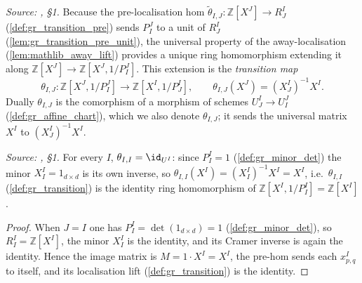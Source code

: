 \begin{definition}\leanok
  \label{def:gr_transition}
  \textit{Source: \cite{nitsure-hilbert-quot}, \S 1.}
  Because the pre-localisation hom \(\tilde\theta_{I,J} : \mathbb{Z}[X^J] \to
  R^I_J\) (\cref{def:gr_transition_pre}) sends \(P^J_I\) to a unit of \(R^I_J\)
  (\cref{lem:gr_transition_pre_unit}), the universal property of the
  away-localisation (\cref{lem:mathlib_away_lift}) provides a unique ring
  homomorphism extending it along \(\mathbb{Z}[X^J] \to \mathbb{Z}[X^J, 1/P^J_I]\).
  This extension is the \emph{transition map}
  \[
    \theta_{I,J} : \mathbb{Z}[X^J, 1/P^J_I] \longrightarrow
    \mathbb{Z}[X^I, 1/P^I_J], \qquad \theta_{I,J}(X^J) = (X^I_J)^{-1} X^I .
  \]
  Dually \(\theta_{I,J}\) is the comorphism of a morphism of schemes
  \(U^I_J \to U^J_I\) (\cref{def:gr_affine_chart}), which we also denote
  \(\theta_{I,J}\); it sends the universal matrix \(X^I\) to \((X^I_J)^{-1} X^I\).
\end{definition}

\begin{lemma}\leanok
  \label{lem:gr_transition_self}
  \textit{Source: \cite{nitsure-hilbert-quot}, \S 1.}
  For every \(I\), \(\theta_{I,I} = \id_{U^I}\): since \(P^I_I = 1\)
  (\cref{def:gr_minor_det}) the minor \(X^I_I = 1_{d\times d}\) is its own
  inverse, so \(\theta_{I,I}(X^I) = (X^I_I)^{-1} X^I = X^I\), i.e.\
  \(\theta_{I,I}\) (\cref{def:gr_transition}) is the identity ring homomorphism
  of \(\mathbb{Z}[X^I, 1/P^I_I] = \mathbb{Z}[X^I]\).
\end{lemma}
\begin{proof}
  \leanok
  When \(J = I\) one has \(P^I_I = \det(1_{d\times d}) = 1\)
  (\cref{def:gr_minor_det}), so \(R^I_I = \mathbb{Z}[X^I]\), the minor \(X^I_I\)
  is the identity, and its Cramer inverse is again the identity. Hence the image
  matrix is \(M = 1 \cdot X^I = X^I\), the pre-hom sends each \(x^I_{p,q}\) to
  itself, and its localisation lift (\cref{def:gr_transition}) is the identity.
\end{proof}

